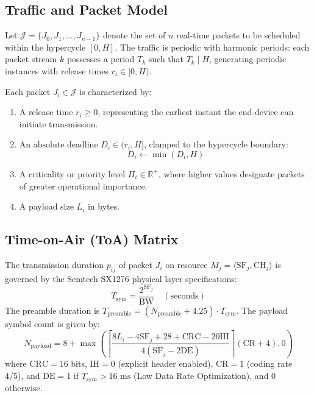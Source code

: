 \documentclass{article}
\begin{document}
\subsection{Traffic and Packet Model}
Let $\mathcal{J} = \{J_0, J_1, \dots, J_{n-1}\}$ denote the set of $n$ real-time packets to be scheduled within the hypercycle $[0, H]$. The traffic is periodic with harmonic periods: each packet stream $k$ possesses a period $T_k$ such that $T_k \mid H$, generating periodic instances with release times $r_i \in [0, H)$.

Each packet $J_i \in \mathcal{J}$ is characterized by:
\begin{enumerate}
    \item A release time $r_i \ge 0$, representing the earliest instant the end-device can initiate transmission.
    \item An absolute deadline $D_i \in (r_i, H]$, clamped to the hypercycle boundary:
    \begin{equation}
    D_i \leftarrow \min(D_i, H)
    \end{equation}
    \item A criticality or priority level $\Pi_i \in \mathbb{R}^+$, where higher values designate packets of greater operational importance.
    \item A payload size $L_i$ in bytes.
\end{enumerate}

\subsection{Time-on-Air (ToA) Matrix}
The transmission duration $p_{ij}$ of packet $J_i$ on resource $M_j = \langle \text{SF}_j, \text{CH}_j \rangle$ is governed by the Semtech SX1276 physical layer specifications:
\begin{equation}
T_{\text{sym}} = \frac{2^{\text{SF}_j}}{\text{BW}} \quad (\text{seconds})
\end{equation}
The preamble duration is $T_{\text{preamble}} = (N_{\text{preamble}} + 4.25) \cdot T_{\text{sym}}$. The payload symbol count is given by:
\begin{equation}
N_{\text{payload}} = 8 + \max\left( \left\lceil \frac{8 L_i - 4\text{SF}_j + 28 + \text{CRC} - 20\text{IH}}{4(\text{SF}_j - 2\text{DE})} \right\rceil (\text{CR} + 4), 0 \right)
\end{equation}
where $\text{CRC} = 16$ bits, $\text{IH} = 0$ (explicit header enabled), $\text{CR} = 1$ (coding rate 4/5), and $\text{DE} = 1$ if $T_{\text{sym}} > 16\text{ ms}$ (Low Data Rate Optimization), and 0 otherwise.
\end{document}
